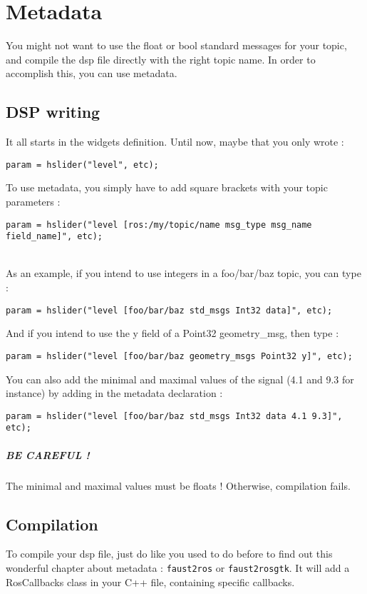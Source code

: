\chapter{Metadata}
\label{chap:spec}
You might not want to use the float or bool standard messages for your topic, and compile the dsp file directly with the right topic name. In order to accomplish this, you can use \ros metadata.
\section{DSP writing}
It all starts in the widgets definition. Until now, maybe that you only wrote :
\begin{lstlisting}
param = hslider("level", etc);
\end{lstlisting}
To use \ros metadata, you simply have to add square brackets with your topic parameters :
\begin{lstlisting}
param = hslider("level [ros:/my/topic/name msg_type msg_name field_name]", etc);
\end{lstlisting}
~\\
As an example, if you intend to use integers in a foo/bar/baz topic, you can type :
\begin{lstlisting}
param = hslider("level [foo/bar/baz std_msgs Int32 data]", etc);
\end{lstlisting}
And if you intend to use the y field of a Point32 geometry\_msg, then type :
\begin{lstlisting}
param = hslider("level [foo/bar/baz geometry_msgs Point32 y]", etc);
\end{lstlisting}
You can also add the minimal and maximal values of the signal (4.1 and 9.3 for instance) by adding in the metadata declaration :
\begin{lstlisting}
param = hslider("level [foo/bar/baz std_msgs Int32 data 4.1 9.3]", etc);
\end{lstlisting}
\paragraph{\color{yoheader}BE CAREFUL !}The minimal and maximal values must be floats ! Otherwise, compilation fails.
\newpage
\section{Compilation}
To compile your dsp file, just do like you used to do before to find out this wonderful chapter about metadata : \lstinline'faust2ros' or \lstinline'faust2rosgtk'. It will add a RosCallbacks class in your C++ file, containing specific callbacks.
